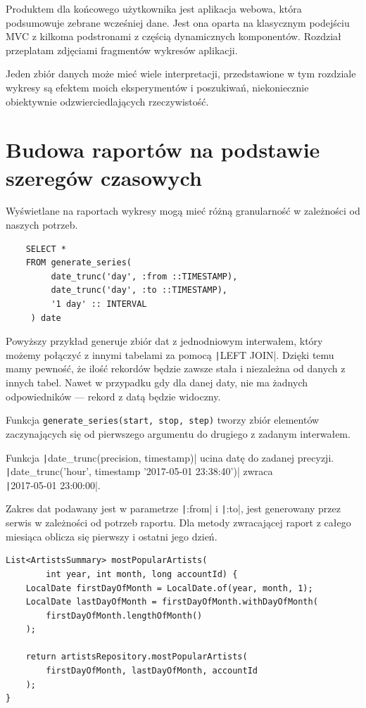 \documentclass[openright]{xmgr}
\begin{document}
    Produktem dla końcowego użytkownika jest aplikacja webowa, która podsumowuje zebrane wcześniej dane.
    Jest ona oparta na klasycznym podejściu MVC z kilkoma podstronami z częścią dynamicznych komponentów.
    Rozdział przeplatam zdjęciami fragmentów wykresów aplikacji.

    Jeden zbiór danych może mieć wiele interpretacji, przedstawione w tym rozdziale wykresy
    są efektem moich eksperymentów i poszukiwań, niekoniecznie obiektywnie odzwierciedlających rzeczywistość.

    \section{Budowa raportów na podstawie szeregów czasowych}

    Wyświetlane na raportach wykresy mogą mieć różną granularność w zależności od naszych potrzeb.

    \begin{verbatim}
    SELECT *
    FROM generate_series(
         date_trunc('day', :from ::TIMESTAMP),
         date_trunc('day', :to ::TIMESTAMP),
         '1 day' :: INTERVAL
     ) date
    \end{verbatim}

    Powyższy przykład generuje zbiór dat z jednodniowym interwałem,
    który możemy połączyć z innymi tabelami za pomocą \texttt|LEFT JOIN|.
    Dzięki temu mamy pewność, że ilość rekordów będzie zawsze stała i niezależna od danych z innych tabel.
    Nawet w przypadku gdy dla danej daty, nie ma żadnych odpowiedników --- rekord z datą będzie widoczny.

    Funkcja \texttt{generate_series(start, stop, step)} tworzy zbiór elementów
    zaczynających się od pierwszego argumentu do drugiego z zadanym interwałem.

    Funkcja \texttt|date_trunc(precision, timestamp)| ucina datę do zadanej precyzji.
    \texttt|date_trunc('hour', timestamp '2017-05-01 23:38:40')| zwraca \\ \texttt|2017-05-01 23:00:00|.

    Zakres dat podawany jest w parametrze \texttt|:from| i \texttt|:to|,
    jest generowany przez serwis w zależności od potrzeb raportu.
    Dla metody zwracającej raport z całego miesiąca oblicza się pierwszy i ostatni jego dzień.

    \begin{verbatim}
List<ArtistsSummary> mostPopularArtists(
        int year, int month, long accountId) {
    LocalDate firstDayOfMonth = LocalDate.of(year, month, 1);
    LocalDate lastDayOfMonth = firstDayOfMonth.withDayOfMonth(
        firstDayOfMonth.lengthOfMonth()
    );

    return artistsRepository.mostPopularArtists(
        firstDayOfMonth, lastDayOfMonth, accountId
    );
}
    \end{verbatim}
\end{document}

